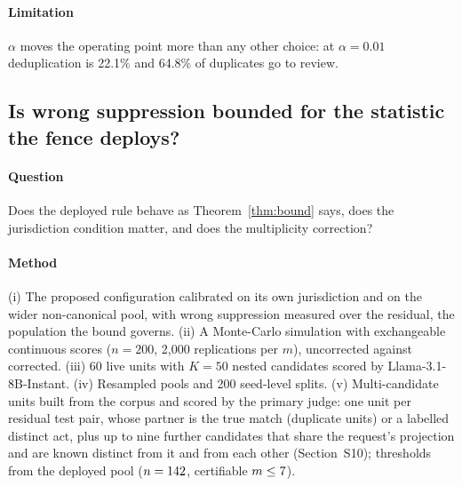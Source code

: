 \paragraph{Limitation} $\alpha$ moves the operating point more than any other choice: at $\alpha=0.01$ deduplication is 22.1\% and 64.8\% of duplicates go to review.

\subsection{Is wrong suppression bounded for the statistic the fence deploys?}\label{sec:res-bound}

\paragraph{Question} Does the deployed rule behave as Theorem~\ref{thm:bound} says, does the jurisdiction condition matter, and does the multiplicity correction?

\paragraph{Method} (i) The proposed configuration calibrated on its own jurisdiction and on the wider non-canonical pool, with wrong suppression measured over the residual, the population the bound governs. (ii) A Monte-Carlo simulation with exchangeable continuous scores ($n=200$, 2,000 replications per $m$), uncorrected against corrected. (iii) 60 live units with $K=50$ nested candidates scored by Llama-3.1-8B-Instant. (iv) Resampled pools and 200 seed-level splits. (v) Multi-candidate units built from the corpus and scored by the primary judge: one unit per residual test pair, whose partner is the true match (duplicate units) or a labelled distinct act, plus up to nine further candidates that share the request's projection and are known distinct from it and from each other (Section~S10); thresholds from the deployed pool ($n=142$, certifiable $m\le7$).

